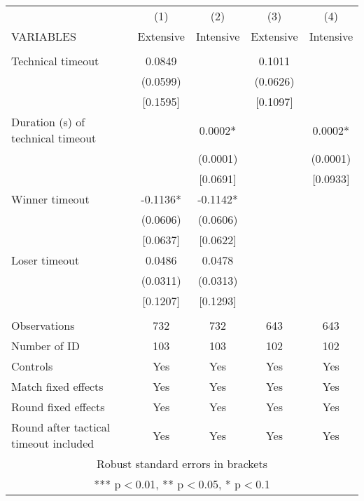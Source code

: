 \documentclass[]{article}
\begin{document}
\begin{tabular}{lcccc} \hline
 & (1) & (2) & (3) & (4) \\
VARIABLES & Extensive & Intensive & Extensive & Intensive \\ \hline
 &  &  &  &  \\
Technical timeout & 0.0849 &  & 0.1011 &  \\
 & (0.0599) &  & (0.0626) &  \\
 & [0.1595] &  & [0.1097] &  \\
Duration (s) of technical timeout &  & 0.0002* &  & 0.0002* \\
 &  & (0.0001) &  & (0.0001) \\
 &  & [0.0691] &  & [0.0933] \\
Winner timeout & -0.1136* & -0.1142* &  &  \\
 & (0.0606) & (0.0606) &  &  \\
 & [0.0637] & [0.0622] &  &  \\
Loser timeout & 0.0486 & 0.0478 &  &  \\
 & (0.0311) & (0.0313) &  &  \\
 & [0.1207] & [0.1293] &  &  \\
 &  &  &  &  \\
Observations & 732 & 732 & 643 & 643 \\
Number of ID & 103 & 103 & 102 & 102 \\
Controls & Yes & Yes & Yes & Yes \\
Match fixed effects & Yes & Yes & Yes & Yes \\
Round fixed effects & Yes & Yes & Yes & Yes \\
 Round after tactical timeout included & Yes & Yes & Yes & Yes \\ \hline
\multicolumn{5}{c}{ Robust standard errors in brackets} \\
\multicolumn{5}{c}{ *** p$<$0.01, ** p$<$0.05, * p$<$0.1} \\
\end{tabular}
\end{document}
